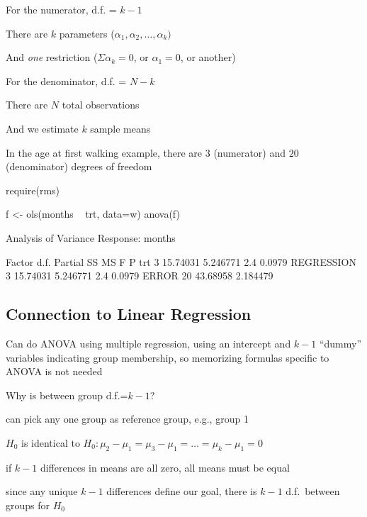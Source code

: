      \item For the numerator, d.f. = $k - 1$
       \bi 
          \item There are $k$ parameters ($\alpha_1, \alpha_2, \ldots,
            \alpha_k)$ 
          \item And \textit{one} restriction ($\Sigma \alpha_k = 0$,
            or $\alpha_1 = 0$, or another) 
       \ei
     \item For the denominator, d.f. = $N - k$
       \bi 
          \item There are $N$ total observations
          \item And we estimate $k$ sample means
       \ei
     \item In the age at first walking example, there are $3$ (numerator) and $20$ (denominator) degrees of freedom
   \ei
\begin{Schunk}
\begin{Sinput}
require(rms)
\end{Sinput}
\begin{Sinput}
f <- ols(months ~ trt, data=w)
anova(f)
\end{Sinput}
\begin{Soutput}
                Analysis of Variance          Response: months 

 Factor     d.f. Partial SS MS       F   P     
 trt         3   15.74031   5.246771 2.4 0.0979
 REGRESSION  3   15.74031   5.246771 2.4 0.0979
 ERROR      20   43.68958   2.184479           
\end{Soutput}
\end{Schunk}
\ei


\subsection{Connection to Linear Regression}
\bi
\item Can do ANOVA using multiple regression, using an intercept and
  $k-1$ ``dummy'' variables indicating group membership, so memorizing
  formulas specific to ANOVA is not needed
\item Why is between group d.f.=$k-1$?
 \bi
 \item can pick any one group as reference group, e.g., group 1
 \item $H_0$ is identical to
   $H_{0}:\mu_{2}-\mu_{1}=\mu_{3}-\mu_{1}=\ldots=\mu_{k}-\mu_{1}=0$
 \item if $k-1$ differences in means are all zero, all means must be
   equal
 \item since any unique $k-1$ differences define our goal, there is $k-1$
   d.f.\ between groups for $H_0$
 \ei
\ei

